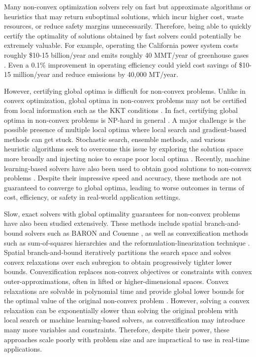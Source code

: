 \documentclass[10pt]{article} %
\theoremstyle{plain}
\theoremstyle{definition}
\theoremstyle{remark}
\begin{document}
Many non-convex optimization solvers rely on fast but approximate algorithms or heuristics that may return suboptimal solutions, which incur higher cost, waste resources, or reduce safety margins unnecessarily. Therefore, being able to quickly certify the optimality of solutions obtained by fast solvers could potentially be extremely valuable. For example, operating the California power system costs roughly \$10-15 billion/year and emits roughly 40 MMT/year of greenhouse gases \citep{CAISO_DMM_2023}. Even a 0.1\% improvement in operating efficiency could yield cost savings of \$10-15 million/year and reduce emissions by 40,000 MT/year.

However, certifying global optima is difficult for non-convex problems. Unlike in convex optimization, global optima in non-convex problems may not be certified from local information such as the KKT conditions \citep{boyd2004convex}. In fact, certifying global optima in non-convex problems is NP-hard in general \citep{murty1985some}. 
A major challenge is the possible presence of multiple local optima where local search and gradient-based methods can get stuck. Stochastic search, ensemble methods, and various heuristic algorithms seek to overcome this issue by exploring the solution space more broadly and injecting noise to escape poor local optima \citep{dauphin2014identifying, kumar2020test}. Recently, machine learning-based solvers have also been used to obtain good solutions to non-convex problems \citep{donti2021dc3, jiang2024advancements}. Despite their impressive speed and accuracy, these methods are not guaranteed to converge to global optima, leading to worse outcomes in terms of cost, efficiency, or safety in real-world application settings.

Slow, exact solvers with global optimality guarantees for non-convex problems have also been studied extensively. These methods include spatial branch-and-bound solvers such as BARON and Couenne \citep{tawarmalani2005polyhedral, belotti2009branching}, as well as convexification methods such as sum-of-squares hierarchies and the reformulation-linearization technique \citep{lasserre2001global, ahmadi2019dsos, rudi2020finding, sherali2013reformulation}. Spatial branch-and-bound iteratively partitions the search space and solves convex relaxations over each subregion to obtain progressively tighter lower bounds. Convexification replaces non-convex objectives or constraints with convex outer-approximations, often in lifted or higher-dimensional spaces. Convex relaxations are solvable in polynomial time and provide global lower bounds for the optimal value of the original non-convex problem \citep{boyd2004convex}.
However, solving a convex relaxation can be exponentially slower than solving the original problem with local search or machine learning-based solvers, as convexification may introduce many more variables and constraints. Therefore, despite their power, these approaches scale poorly with problem size and are impractical to use in real-time applications.
\end{document}

